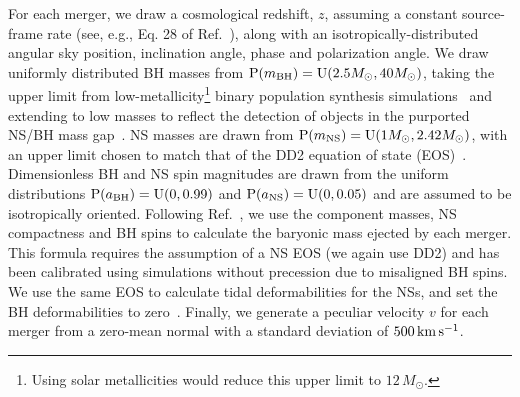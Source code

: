 \documentclass[%
 reprint,
 superscriptaddress,
 nofootinbib,
 amsmath,amssymb,
 aps,
]{revtex4-2}
\newcommand{\msun}{M_\odot}
\newcommand{\prob}{\ensuremath{{\rm P}}}
\newcommand{\abh}{a_{\rm BH}}
\newcommand{\ans}{a_{\rm NS}}
\newcommand{\mbh}{m_{\rm BH}}
\newcommand{\mns}{m_{\rm NS}}
\newcommand{\uniform}{{\rm U}}
\newcommand{\kms}{\ensuremath{{\rm km\,s^{-1}}}}
\begin{document}
For each merger, we draw a cosmological redshift, $z$, assuming a constant source-frame rate (see, e.g., Eq. 28 of Ref.~\cite{Mortlock_etal:2019}), along with an isotropically-distributed angular sky position, inclination angle, phase and polarization angle. We draw uniformly distributed BH masses from $\prob(\mbh) = \uniform(2.5\msun, 40\msun)$, taking the upper limit from low-metallicity\footnote{Using solar metallicities would reduce this upper limit to $12\,\msun$.} binary population synthesis simulations~\cite{Kruckow_etal:2018} and extending to low masses to reflect the detection of objects in the purported NS/BH mass gap~\cite{LVC:2020O3acat}. NS masses are drawn from $\prob(\mns) = \uniform(1\msun, 2.42\msun)$, with an upper limit chosen to match that of the DD2 equation of state (EOS)~\cite{Typel_etal:2010,*Hempel_etal:2010,*Fischer_etal:2014}. Dimensionless BH and NS spin magnitudes are drawn from the uniform distributions $\prob(\abh) = \uniform(0, 0.99)$ and $\prob(\ans) = \uniform(0, 0.05)$ and are assumed to be isotropically oriented. Following Ref.~\cite{Foucart:2012,Foucart_etal:2018}, we use the component masses, NS compactness and BH spins to calculate the baryonic mass ejected by each merger. This formula requires the assumption of a NS EOS (we again use DD2) and has been calibrated using simulations without precession due to misaligned BH spins. We use the same EOS to calculate tidal deformabilities for the NSs, and set the BH deformabilities to zero~\cite{Binnington_Poisson:2009,*Pani_etal:2015,*Cardoso_etal:2017,*Chia:2020}. Finally, we generate a peculiar velocity $v$ for each merger from a zero-mean normal with a standard deviation of $500\,\kms$.
\end{document}
